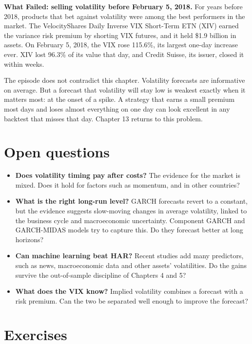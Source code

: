 \begin{callout}
\textbf{What Failed: selling volatility before February 5, 2018.} For years before 2018, products that bet against volatility were among the best performers in the market. The VelocityShares Daily Inverse VIX Short-Term ETN (XIV) earned the variance risk premium by shorting VIX futures, and it held \$1.9 billion in assets. On February 5, 2018, the VIX rose 115.6\%, its largest one-day increase ever. XIV lost 96.3\% of its value that day, and Credit Suisse, its issuer, closed it within weeks.

The episode does not contradict this chapter. Volatility forecasts are informative on average. But a forecast that volatility will stay low is weakest exactly when it matters most: at the onset of a spike. A strategy that earns a small premium most days and loses almost everything on one day can look excellent in any backtest that misses that day. Chapter 13 returns to this problem.
\end{callout}

\section{Open questions}
\label{sec:11-open}

\begin{itemize}
  \item \textbf{Does volatility timing pay after costs?} The evidence for the market is mixed. Does it hold for factors such as momentum, and in other countries?
  \item \textbf{What is the right long-run level?} GARCH forecasts revert to a constant, but the evidence suggests slow-moving changes in average volatility, linked to the business cycle and macroeconomic uncertainty. Component GARCH and GARCH-MIDAS models try to capture this. Do they forecast better at long horizons?
  \item \textbf{Can machine learning beat HAR?} Recent studies add many predictors, such as news, macroeconomic data and other assets' volatilities. Do the gains survive the out-of-sample discipline of Chapters 4 and 5?
  \item \textbf{What does the VIX know?} Implied volatility combines a forecast with a risk premium. Can the two be separated well enough to improve the forecast?
\end{itemize}

\section*{Exercises}

